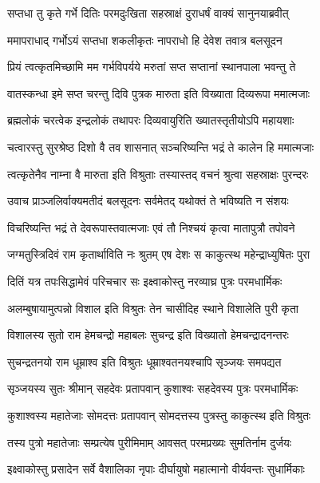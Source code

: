 
\twolineshloka
{सप्तधा तु कृते गर्भे दितिः परमदुःखिता}
{सहस्राक्षं दुराधर्षं वाक्यं सानुनयाब्रवीत्} %

\twolineshloka
{ममापराधाद् गर्भोऽयं सप्तधा शकलीकृतः}
{नापराधो हि देवेश तवात्र बलसूदन} %

\twolineshloka
{प्रियं त्वत्कृतमिच्छामि मम गर्भविपर्यये}
{मरुतां सप्त सप्तानां स्थानपाला भवन्तु ते} %

\twolineshloka
{वातस्कन्धा इमे सप्त चरन्तु दिवि पुत्रक}
{मारुता इति विख्याता दिव्यरूपा ममात्मजाः} %

\twolineshloka
{ब्रह्मलोकं चरत्वेक इन्द्रलोकं तथापरः}
{दिव्यवायुरिति ख्यातस्तृतीयोऽपि महायशाः} %

\twolineshloka
{चत्वारस्तु सुरश्रेष्ठ दिशो वै तव शासनात्}
{सञ्चरिष्यन्ति भद्रं ते कालेन हि ममात्मजाः} %

\twolineshloka
{त्वत्कृतेनैव नाम्ना वै मारुता इति विश्रुताः}
{तस्यास्तद् वचनं श्रुत्वा सहस्राक्षः पुरन्दरः} %

\twolineshloka
{उवाच प्राञ्जलिर्वाक्यमतीदं बलसूदनः}
{सर्वमेतद् यथोक्तं ते भविष्यति न संशयः} %

\twolineshloka
{विचरिष्यन्ति भद्रं ते देवरूपास्तवात्मजाः}
{एवं तौ निश्चयं कृत्वा मातापुत्रौ तपोवने} %

\twolineshloka
{जग्मतुस्त्रिदिवं राम कृतार्थाविति नः श्रुतम्}
{एष देशः स काकुत्स्थ महेन्द्राध्युषितः पुरा} %

\twolineshloka
{दितिं यत्र तपःसिद्धामेवं परिचचार सः}
{इक्ष्वाकोस्तु नरव्याघ्र पुत्रः परमधार्मिकः} %

\twolineshloka
{अलम्बुषायामुत्पन्नो विशाल इति विश्रुतः}
{तेन चासीदिह स्थाने विशालेति पुरी कृता} %

\twolineshloka
{विशालस्य सुतो राम हेमचन्द्रो महाबलः}
{सुचन्द्र इति विख्यातो हेमचन्द्रादनन्तरः} %

\twolineshloka
{सुचन्द्रतनयो राम धूम्राश्व इति विश्रुतः}
{धूम्राश्वतनयश्चापि सृञ्जयः समपद्यत} %

\twolineshloka
{सृञ्जयस्य सुतः श्रीमान् सहदेवः प्रतापवान्}
{कुशाश्वः सहदेवस्य पुत्रः परमधार्मिकः} %

\twolineshloka
{कुशाश्वस्य महातेजाः सोमदत्तः प्रतापवान्}
{सोमदत्तस्य पुत्रस्तु काकुत्स्थ इति विश्रुतः} %

\twolineshloka
{तस्य पुत्रो महातेजाः सम्प्रत्येष पुरीमिमाम्}
{आवसत् परमप्रख्यः सुमतिर्नाम दुर्जयः} %

\twolineshloka
{इक्ष्वाकोस्तु प्रसादेन सर्वे वैशालिका नृपाः}
{दीर्घायुषो महात्मानो वीर्यवन्तः सुधार्मिकाः} %

